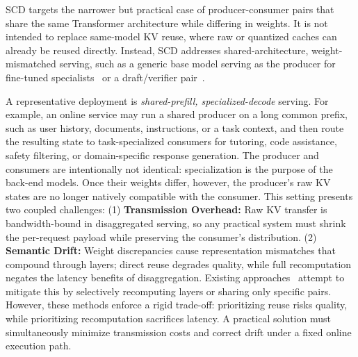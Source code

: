 \documentclass{article}
\theoremstyle{plain}
\theoremstyle{definition}
\theoremstyle{remark}
\begin{document}

SCD targets the narrower but practical case of producer-consumer pairs that share the same Transformer architecture while differing in weights. It is not intended to replace same-model KV reuse, where raw or quantized caches can already be reused directly. Instead, SCD addresses shared-architecture, weight-mismatched serving, such as a generic base model serving as the producer for fine-tuned specialists~\citep{sheng2024slora,chen2024punica} or a draft/verifier pair~\citep{cai2024medusa,li2024eagle}.

A representative deployment is \emph{shared-prefill, specialized-decode} serving. For example, an online service may run a shared producer on a long common prefix, such as user history, documents, instructions, or a task context, and then route the resulting state to task-specialized consumers for tutoring, code assistance, safety filtering, or domain-specific response generation. The producer and consumers are intentionally not identical: specialization is the purpose of the back-end models. Once their weights differ, however, the producer's raw KV states are no longer natively compatible with the consumer. This setting presents two coupled challenges: (1) \textbf{Transmission Overhead:} Raw KV transfer is bandwidth-bound in disaggregated serving, so any practical system must shrink the per-request payload while preserving the consumer's distribution. (2) \textbf{Semantic Drift:} Weight discrepancies cause representation mismatches that compound through layers; direct reuse degrades quality, while full recomputation negates the latency benefits of disaggregation. Existing approaches~\citep{liu2024droidspeak} attempt to mitigate this by selectively recomputing layers or sharing only specific pairs. However, these methods enforce a rigid trade-off: prioritizing reuse risks quality, while prioritizing recomputation sacrifices latency. A practical solution must simultaneously minimize transmission costs and correct drift under a fixed online execution path.
\end{document}
